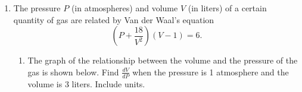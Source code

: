 \documentclass{article}
\begin{document}
\begin{enumerate}
\pspace{\newpage}
  
\item
  \label{spring2011-mb-midterm1-8} 

  The pressure $P$ (in atmospheres) and volume $V$ (in liters) of a
  certain quantity of gas are related by Van der Waal's equation
  \begin{equation*}
    \label{spring2011-mb-midterm1-8-eq}
    \left(P + \frac{18}{V^2}\right) (V-1) = 6.
  \end{equation*}

  \begin{enumerate}



  \item
    \begin{problem}[\stretch{3}]
      The graph of the relationship between the volume and the pressure of the gas is shown below.  Find 
      $\frac{dV}{dP} $ when the pressure is 1 atmosphere and the volume is 3 liters. Include units.

    \end{problem}


\end{enumerate}
\end{enumerate}
\end{document}

